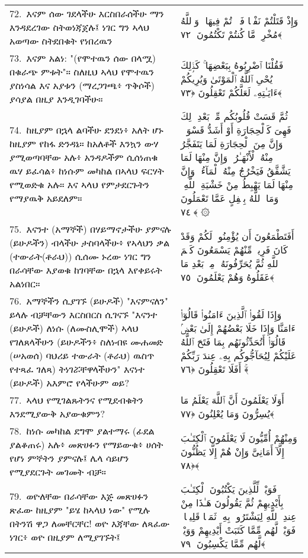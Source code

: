 \documentclass[11pt,a4paper,oneside]{article}%
\newcommand{\mytextarabic}[1]{\textarabic{ #1 \flushright}}
\begin{document}
\begin{longtable}{%
  @{}
    p{}
  @{~~~}
    p{}
    @{}
}
72.\ እናም ሰው ገደላችሁ እርስበራሰችሁ ማን እንዳደረገው ስትወነጃጀሉ፤ ነገር ግን ኣላህ አወጣው ስትደበቁት የነበረዉን &  \mytextarabic{وَإِذْ قَتَلْتُمْ نَفْسًۭا فَٱدَّٟرَْٟٔتُمْ فِيهَا ۖ وَٱللَّهُ مُخْرِجٌۭ مَّا كُنتُمْ تَكْتُمُونَ ﴿٧٢﴾}\\
73.\ እናም አልነ: "(የሞተዉን ሰው በላሟ) በቁራጭ ምቱት"። ስለዚህ ኣላህ የሞተዉን ያስነሳል እና አያቱን (ማረጋገጫ፥ ጥቅሶች) ያሳያል በዚያ እንዲገባችሁ። &  \mytextarabic{ فَقُلْنَا ٱضْرِبُوهُ بِبَعْضِهَا ۚ كَذَٟلِكَ يُحْىِ ٱللَّهُ ٱلْمَوْتَىٰ وَيُرِيكُمْ ءَايَـٰتِهِۦ لَعَلَّكُمْ تَعْقِلُونَ ﴿٧٣﴾}\\
74.\ ከዚያም በኋላ ልባችሁ ደንደነ፥ አለት ሆኑ ከዚያም የከፋ ድንዳኔ። ከአለቶች እንኳን ውሃ ያሚወጣባቸው አሉ፥ አንዳዶችም ሲሰነጠቁ ዉሃ ይፈሳል፥ ከነሱም መካከል በኣላህ ፍርሃት የሚወድቁ አሉ። እና ኣላህ የምታደርጉትን የማያዉቅ አይደለም። &  \mytextarabic{ ثُمَّ قَسَتْ قُلُوبُكُم مِّنۢ بَعْدِ ذَٟلِكَ فَهِىَ كَٱلْحِجَارَةِ أَوْ أَشَدُّ قَسْوَةًۭ ۚ وَإِنَّ مِنَ ٱلْحِجَارَةِ لَمَا يَتَفَجَّرُ مِنْهُ ٱلْأَنْهَـٰرُ ۚ وَإِنَّ مِنْهَا لَمَا يَشَّقَّقُ فَيَخْرُجُ مِنْهُ ٱلْمَآءُ ۚ وَإِنَّ مِنْهَا لَمَا يَهْبِطُ مِنْ خَشْيَةِ ٱللَّهِ ۗ وَمَا ٱللَّهُ بِغَٟفِلٍ عَمَّا تَعْمَلُونَ ﴿٧٤﴾ ۞}\\
75.\ እናንተ (አማኞች) በሃይማኖታችሁ ያምናሉ (ይሁዶችን) ብላችሁ ታስባላችሁ፥ የኣላህን ቃል (ተውራት(ቶራህ)) ሲሰሙ ኑረው ነገር ግን በራሳቸው እያወቁ ከገባቸው በኋላ እየቀይሩት አልነበር።  &  \mytextarabic{ أَفَتَطْمَعُونَ أَن يُؤْمِنُوا۟ لَكُمْ وَقَدْ كَانَ فَرِيقٌۭ مِّنْهُمْ يَسْمَعُونَ كَلَٟمَ ٱللَّهِ ثُمَّ يُحَرِّفُونَهُۥ مِنۢ بَعْدِ مَا عَقَلُوهُ وَهُمْ يَعْلَمُونَ ﴿٧٥﴾}\\
76.\ አማኞችን ሲያገኙ (ይሁዶች) "እናምናለን" ይላሉ ብቻቸውን እርስበርስ ሲገናኙ "እናንተ (ይሁዶች) ለነሱ (ለሙስሊሞች) ኣላህ የገለጸላችሁን (ይሁዶችን፥ ስለነብዩ ሙሐመድ (ሠአወሰ) ባህሪይ ተውራት (ቶራህ) ዉስጥ የተጻፈ ገለጻ) ትነገሯቸዋላችሁን" እናነተ (ይሁዶች) አእምሮ የላችሁም ወይ? &  \mytextarabic{وَإِذَا لَقُوا۟ ٱلَّذِينَ ءَامَنُوا۟ قَالُوٓا۟ ءَامَنَّا وَإِذَا خَلَا بَعْضُهُمْ إِلَىٰ بَعْضٍۢ قَالُوٓا۟ أَتُحَدِّثُونَهُم بِمَا فَتَحَ ٱللَّهُ عَلَيْكُمْ لِيُحَآجُّوكُم بِهِۦ عِندَ رَبِّكُمْ ۚ أَفَلَا تَعْقِلُونَ ﴿٧٦﴾}\\
77.\ ኣላህ የሚገልጹትንና የሚደብቁትን እንደሚያውቅ አያውቁምን? &  \mytextarabic{ أَوَلَا يَعْلَمُونَ أَنَّ ٱللَّهَ يَعْلَمُ مَا يُسِرُّونَ وَمَا يُعْلِنُونَ ﴿٧٧﴾}\\
78.\ ከነሱ መካከል ደግሞ ያልተማሩ (ፊደል ያልቆጠሩ) አሉ፥ መጽሀፉን የማይውቁ፥ ሀሰት የሆነ ምኞትን ያምናሉ፤ ሌላ ሳይሆን የሚያደርጉት መገመት ብቻ። &  \mytextarabic{وَمِنْهُمْ أُمِّيُّونَ لَا يَعْلَمُونَ ٱلْكِتَـٰبَ إِلَّآ أَمَانِىَّ وَإِنْ هُمْ إِلَّا يَظُنُّونَ ﴿٧٨﴾}\\
79.\ ወዮለቸው በራሳቸው እጅ መጽሀፉን ጽፈው ከዚያም "ይሄ ከኣላህ ነው" የሚሉ በትንሽ ዋጋ ለመቸርቸር! ወዮ እጃቸው ለጻፈው ነገር፥ ወዮ በዚያም ለሚያገኙት፤  &  \mytextarabic{فَوَيْلٌۭ لِّلَّذِينَ يَكْتُبُونَ ٱلْكِتَـٰبَ بِأَيْدِيهِمْ ثُمَّ يَقُولُونَ هَـٰذَا مِنْ عِندِ ٱللَّهِ لِيَشْتَرُوا۟ بِهِۦ ثَمَنًۭا قَلِيلًۭا ۖ فَوَيْلٌۭ لَّهُم مِّمَّا كَتَبَتْ أَيْدِيهِمْ وَوَيْلٌۭ لَّهُم مِّمَّا يَكْسِبُونَ ﴿٧٩﴾}\\

\end{longtable}
\end{document}

